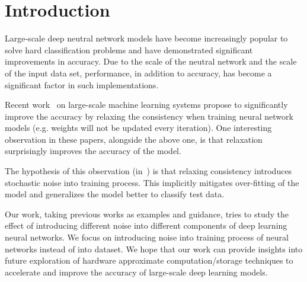 \section{Introduction}
\label{sec:intro}

Large-scale deep neutral network models have become increasingly popular to
solve hard classification problems and have demonstrated significant
improvements in accuracy. Due to the scale of the neutral network and the
scale of the input data set, performance, in addition to accuracy, has
become a significant factor in such implementations.

Recent work~\cite{chilimbi14adam,wan2013dropconnect} on large-scale
machine learning systems propose to significantly improve the accuracy
by relaxing the consistency when training neural network models (e.g.
weights will not be updated every iteration). One interesting observation
in these papers, alongside the above one, is that relaxation
surprisingly improves the accuracy of the model.

The hypothesis of this observation (in~\cite{chilimbi14adam}) is that
relaxing consistency introduces stochastic noise into training process.
This implicitly mitigates over-fitting of the model and generalizes the
model better to classify test data.

Our work, taking previous works as examples and guidance, tries to
study the effect of introducing different noise into different
components of deep learning neural networks. We focus on introducing
noise into training process of neural networks instead of into dataset.
We hope that our work can provide insights into future exploration of
hardware approximate computation/storage techniques to accelerate and
improve the accuracy of large-scale deep learning models.


